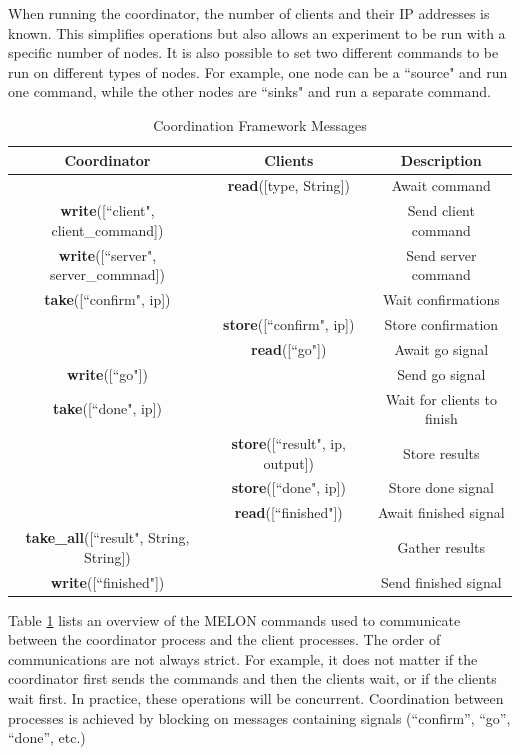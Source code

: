 When running the coordinator, the number of clients and their IP addresses is known. This simplifies operations but also allows an experiment to be run with a specific number of nodes. It is also possible to set two different commands to be run on different types of nodes. For example, one node can be a ``source" and run one command, while the other nodes are ``sinks" and run a separate command.

\begin{table}\footnotesize
\centering
\caption{Coordination Framework Messages}
\begin{tabular}{|c|c|c|}
\hline
Coordinator & Clients & Description \\ \hline
 & \textbf{read}([type, String]) & Await command \\ \hline
\textbf{write}([``client", client\_command]) & & Send client command \\ \hline
\textbf{write}([``server", server\_commnad]) & & Send server command \\ \hline
\textbf{take}([``confirm", ip]) & & Wait confirmations \\ \hline
 & \textbf{store}([``confirm", ip]) & Store confirmation \\ \hline
 & \textbf{read}([``go"]) & Await go signal \\ \hline
\textbf{write}([``go"]) & & Send go signal \\ \hline
\textbf{take}([``done", ip]) & & Wait for clients to finish \\ \hline
& \textbf{store}([``result", ip, output]) & Store results \\ \hline
& \textbf{store}([``done", ip]) & Store done signal \\ \hline
& \textbf{read}([``finished"]) & Await finished signal \\ \hline
\textbf{take\_all}([``result", String, String]) & & Gather results \\ \hline
\textbf{write}([``finished"]) & & Send finished signal \\ \hline
\end{tabular}
\label{table:framework}
\end{table}

Table \ref{table:framework} lists an overview of the MELON commands used to communicate between the coordinator process and the client processes. The order of communications are not always strict. For example, it does not matter if the coordinator first sends the commands and then the clients wait, or if the clients wait first. In practice, these operations will be concurrent. Coordination between processes is achieved by blocking on messages containing signals (``confirm'', ``go'', ``done'', etc.)

